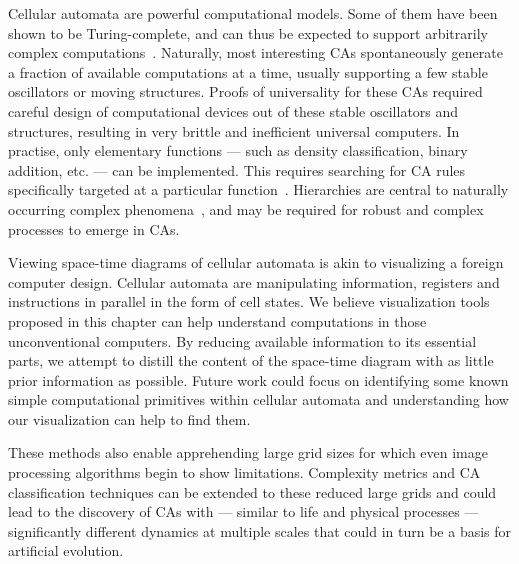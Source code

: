 Cellular automata are powerful computational models. Some of them have been
shown to be Turing-complete, and can thus be expected to support arbitrarily
complex computations~\parencite{berlekampWinningWaysYour2001,
  cookUniversalityElementaryCellular2004}. Naturally, most interesting CAs
spontaneously generate a fraction of available computations at a time, usually
supporting a few stable oscillators or moving structures. Proofs of universality
for these CAs required careful design of computational devices out of these
stable oscillators and structures, resulting in very brittle and inefficient
universal computers. In practise, only elementary functions --- such as density
classification, binary addition, etc. --- can be implemented. This requires
searching for CA rules specifically targeted at a particular
function~\parencite{mitchellEvolvingCellularAutomata1996, wolframNewKindScience2002,
  sapinResearchCellularAutomaton2003}. Hierarchies are central to naturally
occurring complex phenomena~\parencite{simonArchitectureComplexity1962}, and may be
required for robust and complex processes to emerge in CAs.

Viewing space-time diagrams of cellular automata is akin to visualizing a
foreign computer design. Cellular automata are manipulating information,
registers and instructions in parallel in the form of cell states. We believe
visualization tools proposed in this chapter can help understand computations in
those unconventional computers. By reducing available information to its
essential parts, we attempt to distill the content of the space-time diagram
with as little prior information as possible. Future work could focus on
identifying some known simple computational primitives within cellular automata
and understanding how our visualization can help to find them.

These methods also enable apprehending large grid sizes for which even image
processing algorithms begin to show limitations. Complexity metrics and CA
classification techniques can be extended to these reduced large grids and could
lead to the discovery of CAs with --- similar to life and physical processes ---
significantly different dynamics at multiple scales that could in turn be a
basis for artificial evolution.
